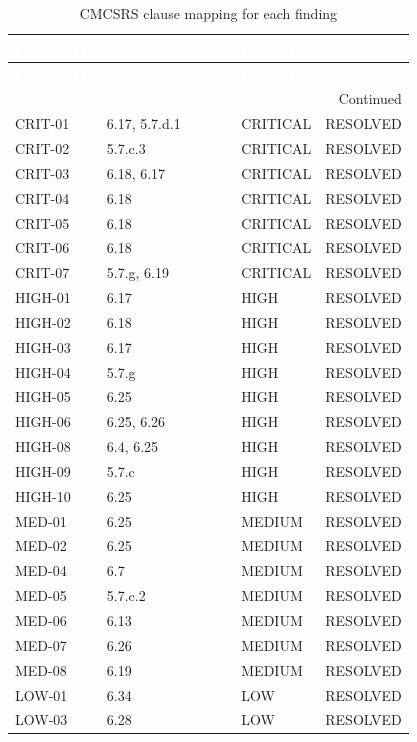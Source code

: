\begin{center}
\begin{longtable}{|p{}|p{}|p{}|p{}|}
\caption[CMCSRS Mapping]{CMCSRS clause mapping for each finding}
\label{tab:cmcsrs-mapping} \\
\hline
\rowcolor{mooveblue}
\textcolor{white}{\textbf{Finding ID}} & \textcolor{white}{\textbf{CMCSRS Clause}} & \textcolor{white}{\textbf{Priority}} & \textcolor{white}{\textbf{Status}} \\
\hline
\endfirsthead
\hline
\rowcolor{mooveblue}
\textcolor{white}{\textbf{Finding ID}} & \textcolor{white}{\textbf{CMCSRS Clause}} & \textcolor{white}{\textbf{Priority}} & \textcolor{white}{\textbf{Status}} \\
\hline
\endhead
\hline
\multicolumn{4}{|r|}{Continued} \\
\hline
\endfoot
\hline
\endlastfoot
CRIT-01 & 6.17, 5.7.d.1 & CRITICAL & RESOLVED \\
CRIT-02 & 5.7.c.3 & CRITICAL & RESOLVED \\
CRIT-03 & 6.18, 6.17 & CRITICAL & RESOLVED \\
CRIT-04 & 6.18 & CRITICAL & RESOLVED \\
CRIT-05 & 6.18 & CRITICAL & RESOLVED \\
CRIT-06 & 6.18 & CRITICAL & RESOLVED \\
CRIT-07 & 5.7.g, 6.19 & CRITICAL & RESOLVED \\
HIGH-01 & 6.17 & HIGH & RESOLVED \\
HIGH-02 & 6.18 & HIGH & RESOLVED \\
HIGH-03 & 6.17 & HIGH & RESOLVED \\
HIGH-04 & 5.7.g & HIGH & RESOLVED \\
HIGH-05 & 6.25 & HIGH & RESOLVED \\
HIGH-06 & 6.25, 6.26 & HIGH & RESOLVED \\
HIGH-08 & 6.4, 6.25 & HIGH & RESOLVED \\
HIGH-09 & 5.7.c & HIGH & RESOLVED \\
HIGH-10 & 6.25 & HIGH & RESOLVED \\
MED-01 & 6.25 & MEDIUM & RESOLVED \\
MED-02 & 6.25 & MEDIUM & RESOLVED \\
MED-04 & 6.7 & MEDIUM & RESOLVED \\
MED-05 & 5.7.c.2 & MEDIUM & RESOLVED \\
MED-06 & 6.13 & MEDIUM & RESOLVED \\
MED-07 & 6.26 & MEDIUM & RESOLVED \\
MED-08 & 6.19 & MEDIUM & RESOLVED \\
LOW-01 & 6.34 & LOW & RESOLVED \\
LOW-03 & 6.28 & LOW & RESOLVED \\
\hline
\end{longtable}
\end{center}

